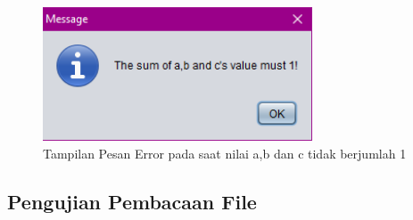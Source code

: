 \begin{enumerate}
	\begin{figure} [H]
	\centering  
	\includegraphics[width=8cm, height=4cm]{pesanError5} 
		\caption[Tampilan Pesan Error pada saat nilai a,b dan c tidak berjumlah 1]{Tampilan Pesan Error pada saat nilai a,b dan c tidak berjumlah 1}
	\label{pesanError5} 
\end{figure}
	
\end{enumerate}

\subsection{Pengujian Pembacaan File}

